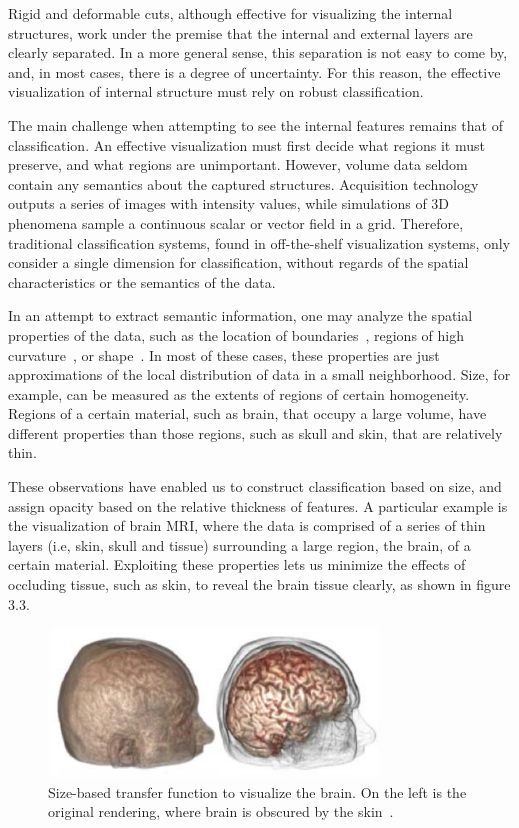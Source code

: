 Rigid and deformable cuts, although effective for visualizing the internal structures, work under the premise that the internal and external layers are clearly separated. In a more general sense, this separation is not easy to come by, and, in most cases, there is a degree of uncertainty. For this reason, the effective visualization of internal structure must rely on robust classification.

The main challenge when attempting to see the internal features remains that of classification. An effective visualization must first decide what regions it must preserve, and what regions are unimportant. However, volume data seldom contain any semantics about the captured structures. Acquisition technology outputs a series of images with intensity values, while simulations of 3D phenomena sample a continuous scalar or vector field in a grid. Therefore, traditional classification systems, found in off-the-shelf visualization systems, only consider a single dimension for classification, without regards of the spatial characteristics or the semantics of the data.

In an attempt to extract semantic information, one may analyze the spatial properties of the data, such as the location of boundaries~\cite{e}, regions of high curvature~\cite{a}, or shape~\cite{f}. In most of these cases, these properties are just approximations of the local distribution of data in a small neighborhood. Size, for example, can be measured as the extents of regions of certain homogeneity. Regions of a certain material, such as brain, that occupy a large volume, have different properties than those regions, such as skull and
skin, that are relatively thin.

These observations have enabled us to construct classification based on size, and assign opacity based on the relative thickness of features. A particular example is the visualization of brain MRI, where the data is comprised of a series of thin layers (i.e, skin, skull and tissue) surrounding a large region, the brain, of a certain material. Exploiting these properties lets us minimize the effects of occluding tissue, such as skin, to reveal the brain tissue clearly, as shown in figure 3.3.

\begin{figure}[!h]
\centering
\includegraphics[width=250pt]{Images/size-tf.png}
\caption{\label{fig:ray_cast1.jpg} Size-based transfer function to visualize the brain. On the left is the original rendering, where brain is obscured by the skin~\cite{a}.}
\end{figure}

